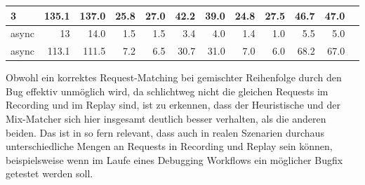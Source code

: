 \documentclass[12pt,a4paper]{report}
\begin{document}
\begin{table}[H]
\begin{tabular}{|l|r|r|r|r|r|r|r|r|r|r|r|}
		3                        & 135.1                              & 137.0                           & 25.8                        & 27.0                      & 42.2                           & 39.0 & 24.8 & 27.5 & 46.7 & 47.0 \\ \hline
		async                    & 13                                 & 14.0                            & 1.5                         & 1.5                       & 3.4                            & 4.0  & 1.4  & 1.0  & 5.5  & 5.0  \\ \hline
		async                    & 113.1                              & 111.5                           & 7.2                         & 6.5                       & 30.7                           & 31.0 & 7.0  & 6.0  & 68.2 & 67.0 \\ \hline
	\end{tabular}
\end{table}

Obwohl ein korrektes Request-Matching bei gemischter Reihenfolge durch den Bug effektiv unmöglich wird, da schlichtweg nicht die
gleichen Requests im Recording und im Replay sind, ist zu erkennen, dass der Heuristische und der Mix-Matcher sich hier insgesamt
deutlich besser verhalten, als die anderen beiden. Das ist in so fern relevant, dass auch in realen Szenarien durchaus
unterschiedliche Mengen an Requests in Recording und Replay sein können, beispielsweise wenn im Laufe eines Debugging Workflows
ein möglicher Bugfix getestet werden soll.
\end{document}
